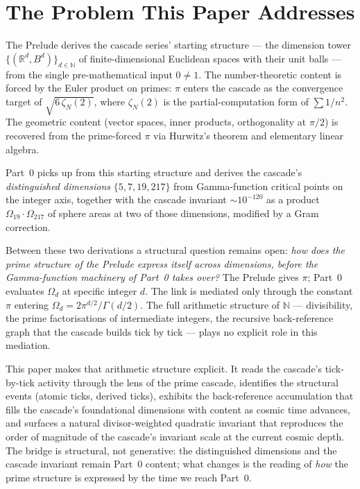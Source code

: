 \documentclass[11pt,a4paper]{article}
\begin{document}
\section{The Problem This Paper Addresses}\label{sec:problem}

The Prelude derives the cascade series' starting structure --- the
dimension tower
$\{(\mathbb{R}^d, B^d)\}_{d \in \mathbb{N}}$ of finite-dimensional
Euclidean spaces with their unit balls --- from the single
pre-mathematical input $0 \neq 1$. The number-theoretic content is
forced by the Euler product on primes: $\pi$ enters the cascade as
the convergence target of $\sqrt{6\,\zeta_N(2)}$, where $\zeta_N(2)$
is the partial-computation form of $\sum 1/n^2$. The geometric
content (vector spaces, inner products, orthogonality at $\pi/2$) is
recovered from the prime-forced $\pi$ via Hurwitz's theorem and
elementary linear algebra.

Part~0 picks up from this starting structure and derives the cascade's
\emph{distinguished dimensions} $\{5, 7, 19, 217\}$ from Gamma-function
critical points on the integer axis, together with the cascade
invariant $\sim 10^{-120}$ as a product $\Omega_{19} \cdot \Omega_{217}$
of sphere areas at two of those dimensions, modified by a Gram
correction.

Between these two derivations a structural question remains open:
\emph{how does the prime structure of the Prelude express itself
across dimensions, before the Gamma-function machinery of Part~0
takes over?} The Prelude gives $\pi$; Part~0 evaluates $\Omega_d$ at
specific integer $d$. The link is mediated only through the constant
$\pi$ entering $\Omega_d = 2\pi^{d/2}/\Gamma(d/2)$. The full
arithmetic structure of $\mathbb{N}$ --- divisibility, the prime
factorisations of intermediate integers, the recursive back-reference
graph that the cascade builds tick by tick --- plays no explicit role
in this mediation.

This paper makes that arithmetic structure explicit. It reads the
cascade's tick-by-tick activity through the lens of the prime
cascade, identifies the structural events (atomic ticks, derived
ticks), exhibits the back-reference accumulation that fills the
cascade's foundational dimensions with content as cosmic time
advances, and surfaces a natural divisor-weighted quadratic invariant
that reproduces the order of magnitude of the cascade's invariant
scale at the current cosmic depth. The bridge is structural, not
generative: the distinguished dimensions and the cascade invariant
remain Part~0 content; what changes is the reading of \emph{how} the
prime structure is expressed by the time we reach Part~0.
\end{document}
